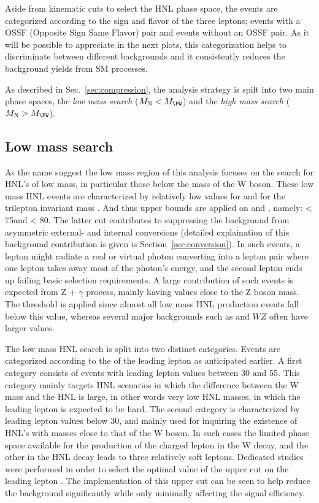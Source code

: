 Aside from kinematic cuts to select the HNL phase space, the events
are categorized according to the sign and flavor of the three
leptons; events with a OSSF (Opposite Sign Same Flavor) pair and
events without an OSSF pair. As it will be possible to appreciate in the
next plots, this categorization helps to discriminate between
different backgrounds and it consistently reduces the background yields
from SM processes.

As described in Sec.~\ref{sec:compression}, the analysis
strategy is spilt into two main phase spaces, the \emph{low mass search} ($M_\hnl <
M_\PW$) and the \emph{high mass search} ($M_\hnl > M_\PW$).

\subsection{Low mass search}

As the name suggest the low mass region of this analysis focuses on
the search for HNL's of low mass, in particular those below the mass
of the W boson. These low mass HNL events are characterized by
relatively low values for \ptmiss  and for the trilepton invariant mass
\mlll. And thus upper bounds are applied on \ptmiss  and \mlll , namely:
\ptmiss < 75\GeV and \mlll < 80\GeV. The latter cut contributes to 
suppressing the background from asymmetric external- and
internal conversions (detailed explaination of this background
contribution is given is Section~\ref{sec:conversion}). In such events, a lepton might radiate a real or
virtual photon converting into a lepton pair where one lepton takes
away most of the photon's energy, and the second lepton ends up
failing basic selection requirements. A large contribution of such
events is expected from Z + $\gamma$ process, mainly having \mlll
values close to the Z boson mass.
The \ptmiss threshold is applied since almost all low mass HNL production
events fall below this value, whereas several major backgrounds such
as \ttbar and $WZ$ often have larger \ptmiss  values.

The low mass HNL search is split into two distinct categories. Events
are categorized according to the \pt of the leading lepton as
anticipated earlier. A first category consists of events with leading
lepton \pt values between 30 and 55\GeV. This category mainly targets
HNL scenarios in which the difference between the W mass and the HNL
is large, in other words very low HNL masses, in which the leading
lepton is expected to be hard. The second category is characterized by
leading lepton \pt values below 30\GeV, and mainly used for inquiring
the existence of HNL's with masses close to that of the W boson. In
such cases the limited phase space available for the production of the
charged lepton in the W decay, and the other in the HNL decay leads to
three relatively soft leptons.
Dedicated studies were performed in order to select the optimal value
of the upper \pt cut on the leading lepton \pt.
The implementation of this upper \pt cut can be seen to help reduce the background significantly while only minimally affecting the signal efficiency.

